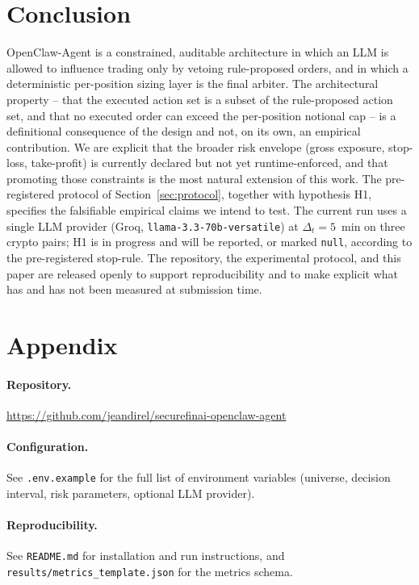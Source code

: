 \documentclass{article}
\begin{document}
\section{Conclusion}
OpenClaw-Agent is a constrained, auditable architecture in which an LLM is allowed to influence trading only by vetoing rule-proposed orders, and in which a deterministic per-position sizing layer is the final arbiter. The architectural property -- that the executed action set is a subset of the rule-proposed action set, and that no executed order can exceed the per-position notional cap -- is a definitional consequence of the design and not, on its own, an empirical contribution. We are explicit that the broader risk envelope (gross exposure, stop-loss, take-profit) is currently declared but not yet runtime-enforced, and that promoting those constraints is the most natural extension of this work. The pre-registered protocol of Section~\ref{sec:protocol}, together with hypothesis H1, specifies the falsifiable empirical claims we intend to test. The current run uses a single LLM provider (Groq, \texttt{llama-3.3-70b-versatile}) at $\Delta_t=5$~min on three crypto pairs; H1 is in progress and will be reported, or marked \texttt{null}, according to the pre-registered stop-rule. The repository, the experimental protocol, and this paper are released openly to support reproducibility and to make explicit what has and has not been measured at submission time.

\section*{Appendix}
\paragraph{Repository.} \url{https://github.com/jeandirel/securefinai-openclaw-agent}
\paragraph{Configuration.} See \texttt{.env.example} for the full list of environment variables (universe, decision interval, risk parameters, optional LLM provider).
\paragraph{Reproducibility.} See \texttt{README.md} for installation and run instructions, and \texttt{results/metrics\_template.json} for the metrics schema.



\end{document}
